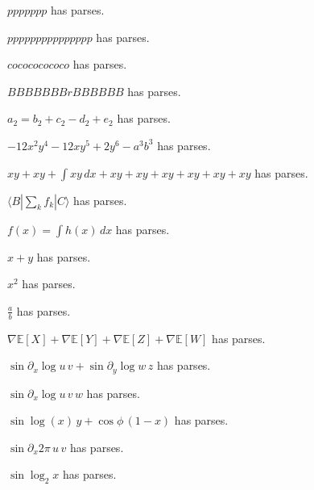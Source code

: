 \documentclass{article}
\makeatletter
\newcommand{\countparses}{\ltx@count@parses}
\makeatother
\begin{document}
$ppppppp$ has \countparses{} parses.

$ppppppppppppppp$ has \countparses{} parses.

$cocococococo$ has \countparses{} parses.

$BBBBBBBrBBBBBB$ has \countparses{} parses.

$a_2 = b_2 + c_2 - d_2 + e_2$ has \countparses{} parses.

$-12x^2 y^4 - 12xy^5 + 2y^6 - a^3 b^3$ has \countparses{} parses.

$xy + xy + \int xy\,dx + xy + xy + xy + xy + xy + xy$ has \countparses{} parses.

$\langle B | \sum_k f_k | C \rangle$ has \countparses{} parses.

$f(x) = \int h(x)\,dx$ has \countparses{} parses.

$x+y$ has \countparses{} parses.

$x^2$ has \countparses{} parses.

$\frac{a}{b}$ has \countparses{} parses.

$\nabla\mathbb{E}[X]+\nabla\mathbb{E}[Y]+\nabla\mathbb{E}[Z]+\nabla\mathbb{E}[W]$ has \countparses{} parses.

$\sin\partial_x\log u\,v+\sin\partial_y\log w\,z$ has \countparses{} parses.

$\sin\partial_x\log u\,v\,w$ has \countparses{} parses.

$\sin\log(x)\,y+\cos\phi\,(1-x)$ has \countparses{} parses.

$\sin\partial_x 2\pi\,u\,v$ has \countparses{} parses.

$\sin\log_2 x$ has \countparses{} parses.
\end{document}
